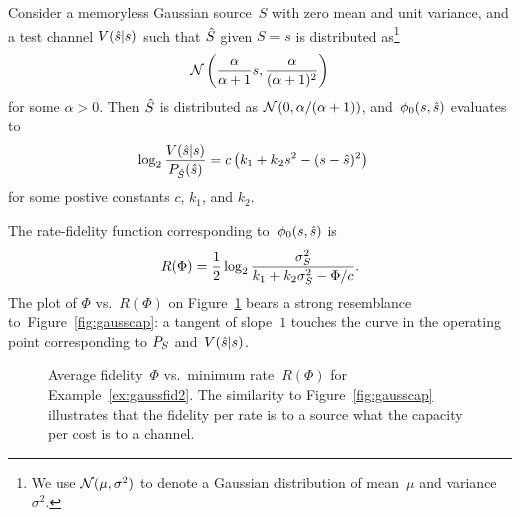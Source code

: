 \begin{example}[Gaussian]
  \label{ex:gaussfid2}
  Consider a memoryless Gaussian source~$S$ with zero mean and unit variance,
  and a test channel $V({\hat{s}}|s)$ such that ${\hat{S}}$ given $S=s$ is distributed
  as\footnote{We use ${\mathcal{N}}(\mu, \sigma^2)$ to denote a Gaussian distribution of
  mean~$\mu$ and variance~$\sigma^2$.}
  \[ {\mathcal{N}}\left( \frac{\alpha}{\alpha+1}s, \frac{ \alpha}{(\alpha+1)^2}
  \right) \]
  for some $\alpha > 0$. Then ${\hat{S}}$ is distributed as ${\mathcal{N}}(0, \alpha /
  (\alpha + 1))$, and~${\phi_0}(s,{\hat{s}})$ evaluates to
  \begin{align*}
    \log_2 \frac{V({\hat{s}}|s)}{{P_{\hat{S}}}({\hat{s}})} 
    &= c \left( k_1 + k_2 s^2 -(s-{\hat{s}})^2 \right)
  \end{align*}
  for some postive constants $c$, $k_1$, and $k_2$.
  
  The rate-fidelity function corresponding to~${\phi_0}(s,{\hat{s}})$ is
  \begin{equation*}
    R(\Phi) = \frac{1}{2} \log_2 \frac{{\sigma_S^2}}{k_1 + k_2 {\sigma_S^2} - \Phi/c}.
  \end{equation*}
  The plot of $\Phi$ vs.\ $R(\Phi)$ on Figure~\ref{fig:ratefidplot} bears a
  strong resemblance to~Figure~\ref{fig:gausscap}: a tangent of slope~$1$
  touches the curve in the operating point corresponding to ${P_S}$
  and~$V({\hat{s}}|s)$. 
  \begin{figure}
    \begin{center}
    \end{center}
    \caption{Average fidelity~$\Phi$ vs.\ minimum rate~$R(\Phi)$ for
    Example~\ref{ex:gaussfid2}. The similarity to Figure~\ref{fig:gausscap}
    illustrates that the fidelity per rate is to a source what the capacity per
    cost is to a channel.}
    \label{fig:ratefidplot}
  \end{figure}
\end{example}

